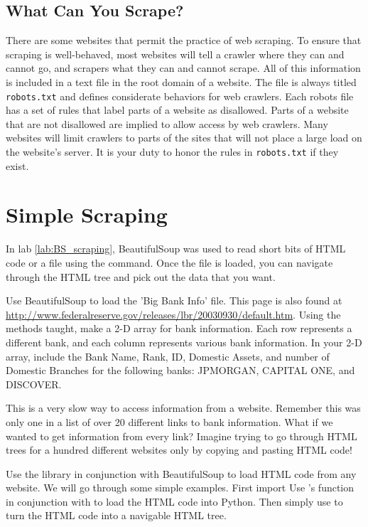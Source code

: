 \subsection*{What Can You Scrape?}
There are some websites that permit the practice of web scraping.
To ensure that scraping is well-behaved, most websites will tell a crawler where they can and cannot go, and scrapers what they can and cannot scrape.
All of this information is included in a text file in the root domain of a website.
The file is always titled \texttt{robots.txt} and defines considerate behaviors for web crawlers.
Each robots file has a set of rules that label parts of a website as disallowed.
Parts of a website that are not disallowed are implied to allow access by web crawlers.
Many websites will limit crawlers to parts of the sites that will not place a large load on the 
website's server.
It is your duty to honor the rules in \texttt{robots.txt} if they exist.

\section*{Simple Scraping}
In lab \ref{lab:BS_scraping}, BeautifulSoup was used to read short bits of HTML code or a file using the  command.
Once the file is loaded, you can navigate through the HTML tree and pick out the data that you want.

\begin{problem}
Use BeautifulSoup to load the 'Big Bank Info' file.
This page is also found at \url{http://www.federalreserve.gov/releases/lbr/20030930/default.htm}.
Using the methods taught, make a 2-D array for bank information.
Each row represents a different bank, and each column represents various bank information.
In your 2-D array, include the Bank Name, Rank, ID, Domestic Assets, and number of Domestic Branches for the following banks: JPMORGAN, CAPITAL ONE, and DISCOVER.
\end{problem}

This is a very slow way to access information from a website.
Remember this was only one in a list of over 20 different links to bank information.
What if we wanted to get information from every link?
Imagine trying to go through HTML trees for a hundred different websites only by copying and pasting HTML code!

Use the  library in conjunction with BeautifulSoup to load HTML code from any website.
We will go through some simple examples.
First import 
Use 's  function in conjunction with  to load the HTML code into Python.
Then simply use  to turn the HTML code into a navigable HTML tree.

